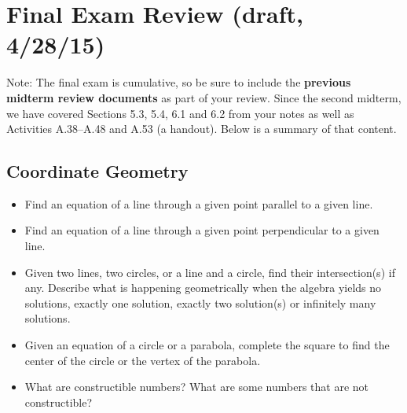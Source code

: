 \newpage

\section{Final Exam Review (draft, 4/28/15)}

Note:  The final exam is cumulative, so be sure to include the \textbf{previous midterm review documents} as part of your review.  
Since the second midterm, we have covered Sections 5.3, 5.4, 6.1 and 6.2 from your notes as well as Activities A.38--A.48 and A.53 (a handout).  Below is a summary of that content.  


\subsection*{Coordinate Geometry}
\begin{itemize}\itemsep-3pt
\item Find an equation of a line through a given point parallel to a given line.
\item Find an equation of a line through a given point perpendicular to a given line.
\item Given two lines, two circles, or a line and a circle, find their intersection(s) if any.  Describe what is happening geometrically when the algebra yields no solutions, exactly one solution, exactly two solution(s) or infinitely many solutions. 
\item Given an equation of a circle or a parabola, complete the square to find the center of the circle or the vertex of the parabola.  
\item What are constructible numbers?  What are some numbers that are not constructible? 
\end{itemize}


